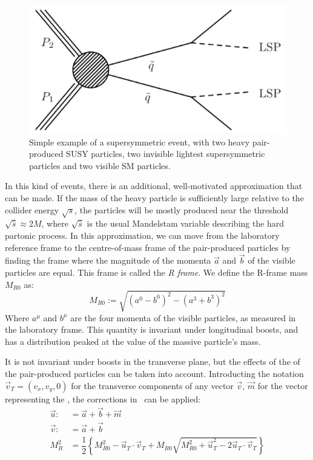 \begin{figure}[htb]
    \centering
    \includegraphics[width=.5\textwidth]{images/pdf/standard_razor_susy}
    \caption{Simple example of a supersymmetric event, with two heavy
    pair-produced SUSY particles, two invisible lightest supersymmetric
particles and two visible SM particles.}
    \label{fig:standard_razor_susy}
\end{figure}
In this kind of events, there is an additional, well-motivated approximation
that can be made. If the mass of the heavy particle is sufficiently large
relative to the collider energy $\sqrt{s}$, the particles will be mostly
produced near the threshold $\sqrt{\hat s} \approx 2M$, where
$\sqrt{\hat s}$ is the usual Mandelstam variable describing the hard
partonic process.
In this approximation, we can move from the laboratory reference frame to
the centre-of-mass frame of the pair-produced particles by finding the frame
where the magnitude of the momenta $\vec a$ and $\vec b$ of the visible particles are equal. This
frame is called the \emph{R frame}.
We define the R-frame mass $M_{R0}$ as:
\begin{equation*}
    M_{R0} \mathop:= \sqrt{(a^0 - b^0)^2 - (a^3 + b^3)^2}
\end{equation*}
Where $a^\mu$ and $b^\mu$ are the four momenta of the visible particles, as
measured in the laboratory frame.
This quantity is invariant under longitudinal boosts, and has a distribution
peaked at the value of the massive particle's mass.

It is not invariant under boosts in the transverse plane, but the
effects of the \pt of the pair-produced particles can be taken into account.
Introducting the notation $\vec{v}_T = (v_x, v_y, 0)$ for the transverse
components of any vector $\vec{v}$, $\vec m$ for the vector representing the
\met, the corrections in~\cite{chris_email}
can be applied:
\begin{align*}
    \vec u \mathop: &= \vec a + \vec b + \vec m\\
    \vec v \mathop: &= \vec a + \vec b\\
    M_R^2 &= \dfrac{1}{2}\left\{ M_{R0}^2  - \vec{u}_T \cdot \vec{v}_T 
    + M_{R0}\sqrt{M_{R0}^2 + \vec{u}_T^2 - 2\vec{u}_T \cdot \vec{v}_T}\right\}
\end{align*}

